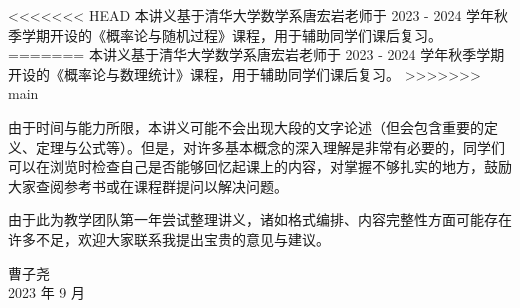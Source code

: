 \documentclass[main.tex]{subfiles}
\begin{document}
<<<<<<< HEAD
本讲义基于清华大学数学系唐宏岩老师于 2023 - 2024 学年秋季学期开设的《概率论与随机过程》课程，用于辅助同学们课后复习。
=======
本讲义基于清华大学数学系唐宏岩老师于 2023 - 2024 学年秋季学期开设的《概率论与数理统计》课程，用于辅助同学们课后复习。
>>>>>>> main

由于时间与能力所限，本讲义可能不会出现大段的文字论述（但会包含重要的定义、定理与公式等）。但是，对许多基本概念的深入理解是非常有必要的，同学们可以在浏览时检查自己是否能够回忆起课上的内容，对掌握不够扎实的地方，鼓励大家查阅参考书或在课程群提问以解决问题。

由于此为教学团队第一年尝试整理讲义，诸如格式编排、内容完整性方面可能存在许多不足，欢迎大家联系我提出宝贵的意见与建议。

\begin{flushright}
    曹子尧\\
    2023 年 9 月
\end{flushright}
\end{document}
